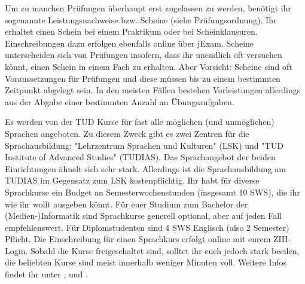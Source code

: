 Um zu manchen Prüfungen überhaupt erst zugelassen zu werden, benötigt ihr sogenannte Leistungsnachweise bzw. Scheine (siehe Prüfungsordnung).
Ihr erhaltet einen Schein bei einem Praktikum oder bei Scheinklausuren.
Einschreibungen dazu erfolgen ebenfalls online über jExam.
Scheine unterscheiden sich von Prüfungen insofern, dass ihr unendlich oft versuchen könnt, einen Schein in einem Fach zu erhalten.
Aber Vorsicht: Scheine sind oft Voraussetzungen für Prüfungen und diese müssen bis zu einem bestimmten Zeitpunkt abgelegt sein.
In den meisten Fällen bestehen Vorleistungen allerdings aus der Abgabe einer bestimmten Anzahl an Übungsaufgaben.

\label{sec:sprachausbildung}

Es werden von der TUD Kurse für fast alle möglichen (und unmöglichen) Sprachen angeboten.
Zu diesem Zweck gibt es zwei Zentren für die Sprachausbildung: "Lehrzentrum Sprachen und Kulturen" (LSK) und "TUD Institute of Advanced Studies" (TUDIAS).
Das Sprachangebot der beiden Einrichtungen ähnelt sich sehr stark. Allerdings ist die Sprachausbildung am TUDIAS im Gegensatz zum LSK kostenpflichtig.
Ihr habt für diverse Sprachkurse ein Budget an Semesterwochenstunden (insgesamt 10 SWS), die ihr wie ihr wollt ausgeben könnt.
Für euer Studium zum Bachelor der (Medien-)Informatik sind Sprachkurse generell optional, aber auf jeden Fall empfehlenswert.
Für Diplomstudenten sind 4 SWS Englisch (also 2 Semester) Pflicht.
Die Einschreibung für einen Sprachkurs erfolgt online \link{\textcolor{red}{NONE}} mit eurem ZIH-Login.
Sobald die Kurse freigeschaltet sind, solltet ihr euch jedoch stark beeilen, die beliebten Kurse sind meist innerhalb weniger Minuten voll.
Weitere Infos findet ihr unter \link{\textcolor{red}{NONE}}, \link{\textcolor{red}{NONE}} und \link{\textcolor{red}{NONE}}.
